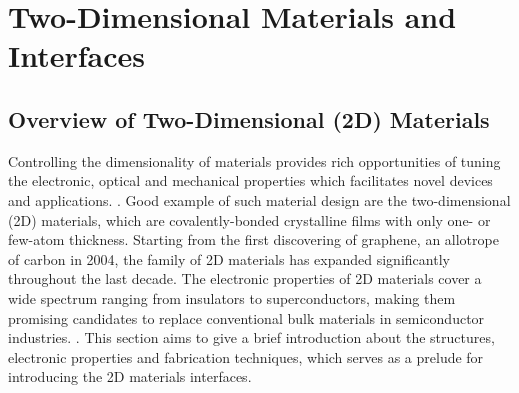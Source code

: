 \chapter{Two-Dimensional Materials and Interfaces}
\label{ch:introduction}
\newcommand*\imgdir{img/ch-intro/}

%

\vspace{1em}



\section{Overview of Two-Dimensional (2D) Materials}
\label{sec:ch-intro-2D}
Controlling the dimensionality of materials provides rich
opportunities of tuning the electronic, optical and mechanical
properties which facilitates novel devices and applications.
 . Good example of such material design are the
two-dimensional (2D) materials, which are covalently-bonded
crystalline films with only one- or few-atom thickness. 
%
Starting from the first discovering of graphene, an allotrope of
carbon in 2004, the family of 2D materials has
expanded significantly throughout the last decade.  The electronic properties of 2D materials
cover a wide spectrum ranging from insulators to superconductors,
making them promising candidates to replace conventional bulk
materials in semiconductor industries. .
%
This section aims to give a brief introduction about the structures,
electronic properties and fabrication techniques, which serves as a
prelude for introducing the 2D materials interfaces.


